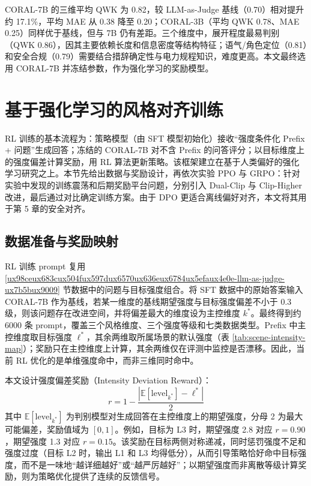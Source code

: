 \documentclass[fontset=fandol,type=master,campus=shenzhen,etitleauto=true]{hithesisbook}
\begin{document}
CORAL-7B 的三维平均 QWK 为 0.82，较 LLM-as-Judge 基线（0.70）相对提升约 17.1\%，平均 MAE 从 0.38 降至 0.20；CORAL-3B（平均 QWK 0.78、MAE 0.25）同样优于基线，但与 7B 仍有差距。三个维度中，展开程度最易判别（QWK 0.86），因其主要依赖长度和信息密度等结构特征；语气/角色定位（0.81）和安全合规（0.79）需要结合措辞确定性与电力规程知识，难度更高。本文最终选用 CORAL-7B 并冻结参数，作为强化学习的奖励模型。

\section{基于强化学习的风格对齐训练}\label{ux57faux4e8eux5f3aux5316ux5b66ux4e60ux7684ux98ceux683cux5bf9ux9f50ux8badux7ec3}

RL 训练的基本流程为：策略模型（由 SFT 模型初始化）接收“强度条件化 Prefix + 问题”生成回答；冻结的 CORAL-7B 对不含 Prefix 的问答评分；以目标维度上的强度偏差计算奖励，用 RL 算法更新策略。该框架建立在基于人类偏好的强化学习研究之上\cite{ref30,ref31,ref32}。本节先给出数据与奖励设计，再依次实验 PPO 与 GRPO：针对实验中发现的训练震荡和后期奖励平台问题，分别引入 Dual-Clip\cite{ref81} 与 Clip-Higher\cite{ref35} 改进，最后通过对比确定训练方案。由于 DPO 更适合离线偏好对齐\cite{ref40}，本文将其用于第 5 章的安全对齐。

\subsection{数据准备与奖励映射}\label{ux6570ux636eux51c6ux5907ux4e0eux5956ux52b1ux6620ux5c04}

RL 训练 prompt 复用 \ref{ux98ceux683cux504fux597dux6570ux636eux6784ux5efaux4e0e-llm-as-judge-ux7b5bux9009} 节数据中的问题与目标强度组合。将 SFT 数据中的原始答案输入 CORAL-7B 作为基线，若某一维度的基线期望强度与目标强度偏差不小于 0.3 级，则该问题存在改进空间，并将偏差最大的维度设为主控维度 $k^*$。最终得到约 6000 条 prompt，覆盖三个风格维度、三个强度等级和七类数据类型。Prefix 中主控维度取目标强度 $\ell^*$，其余两维取所属场景的默认强度（表 \ref{tab:scene-intensity-map}）；奖励只在主控维度上计算，其余两维仅在评测中监控是否漂移。因此，当前 RL 优化的是单维强度命中，而非三维同时命中。

本文设计强度偏差奖励（Intensity Deviation Reward）：
\begin{equation}
r = 1 - \frac{\left|\mathbb{E}[\text{level}_{k^*}] - \ell^*\right|}{2}
\end{equation}
其中 $\mathbb{E}[\text{level}_{k^*}]$ 为判别模型对生成回答在主控维度上的期望强度，分母 2 为最大可能偏差，奖励值域为 $[0,1]$。例如，目标为 L3 时，期望强度 2.8 对应 $r = 0.90$，期望强度 1.3 对应 $r = 0.15$。该奖励在目标两侧对称递减，同时惩罚强度不足和强度过度（目标 L2 时，输出 L1 和 L3 均得低分），从而引导策略恰好命中目标强度，而不是一味地“越详细越好”或“越严厉越好”；以期望强度而非离散等级计算奖励，则为策略优化提供了连续的反馈信号。
\end{document}
